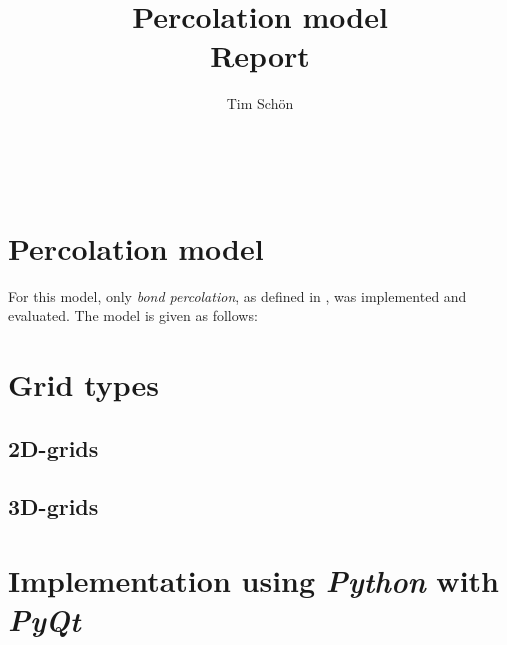 \documentclass[a4paper,fleqn]{article}
\begin{document}
\title{Percolation model\\ \Large{Report}}
\author{Tim Schön}
\date{}
\maketitle
\ \\

\section*{Percolation model}
For this model, only \emph{bond percolation}, as defined in \cite{Percolation}, was implemented and evaluated. The model is given as follows:
\section*{Grid types}
\subsection*{2D-grids}
\subsection*{3D-grids}
\section*{Implementation using \emph{Python} with \emph{PyQt}}

\end{document}
